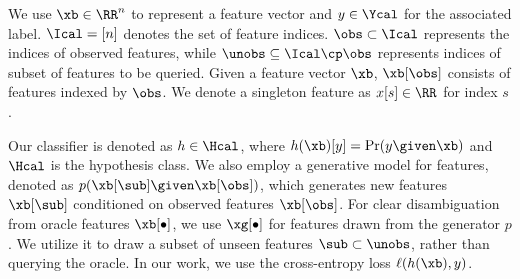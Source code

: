 \documentclass[letterpaper]{article}
\begin{document}
We use $\xb\in \RR^n$ to represent a feature vector and $y\in \Ycal$ for the associated label. $\Ical = [n]$ denotes the set of feature indices. $\obs \subset \Ical$ represents the indices of observed features, while $\unobs \subseteq \Ical\cp \obs$ represents indices of subset of features to be queried. Given a feature vector $\xb$, $\xb[\obs]$ consists of features indexed by $\obs$. We denote a singleton feature as $x[s] \in \RR$ for index $s$.

Our classifier is denoted as $h \in \Hcal$, where $h(\xb)[y] = \Pr(y \given \xb)$ and $\Hcal$ is the hypothesis class. We also employ a generative model for features, denoted as $p(\xb[\sub] \given \xb[\obs])$, which generates new features $\xb[\sub]$ conditioned on observed features $\xb[\obs]$. For clear disambiguation from oracle features $\xb[\bullet]$, we use $\xg[\bullet]$ for features drawn from the generator $p$. We utilize it to draw a subset of unseen features $\sub \subset \unobs$, rather than querying the oracle.
In our work, we use the cross-entropy loss $\ell(h(\xb),y)$.
\end{document}

